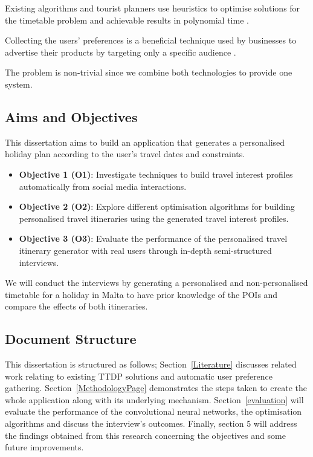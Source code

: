 Existing algorithms and tourist planners use
heuristics to optimise solutions for the timetable
problem and achievable results in polynomial time
\cite{Vansteenwegen2011}.

Collecting the users' preferences is a
beneficial technique used by businesses to advertise
their products by targeting only a specific audience
\cite{article}.

The problem is non-trivial since we combine both
technologies to provide one system.

\subsection{Aims and Objectives}

This dissertation aims to build an application that
generates a personalised holiday plan according to the
user's travel dates and constraints.


\begin{itemize}
    \item \textbf{Objective 1 (O1)}: Investigate techniques to build travel interest
    profiles automatically from social media interactions.  
    \item \textbf{Objective 2 (O2)}: Explore different optimisation algorithms for
    building personalised travel itineraries using the
    generated travel interest profiles. 
    \item \textbf{Objective 3 (O3)}: Evaluate the
    performance of the personalised travel itinerary
    generator with real users through in-depth
    semi-structured interviews. 

\end{itemize}

We will conduct the interviews by generating a
personalised and non-personalised timetable for a
holiday in Malta to have prior knowledge of the POIs
and compare the effects of both itineraries.

\subsection{Document Structure}

This dissertation is structured as follows; Section~\ref{Literature}
discusses related work relating to existing TTDP
solutions and automatic user preference gathering.
Section~\ref{MethodologyPage} demonstrates the steps taken to create the
whole application along with its underlying mechanism.
Section~\ref{evaluation} will evaluate the performance of the
convolutional neural networks, the optimisation
algorithms and discuss the interview's outcomes.
Finally, section 5 will address the findings obtained
from this research concerning the objectives and some
future improvements.

